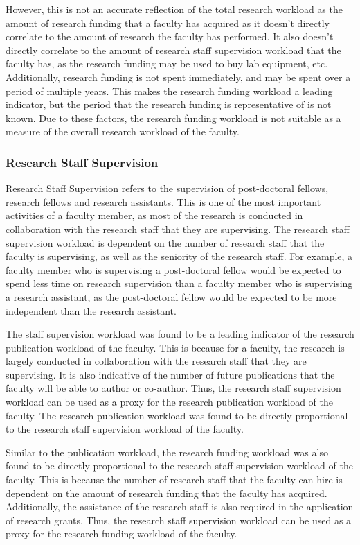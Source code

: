 However, this is not an accurate reflection of the total research workload as the amount of research funding that a faculty has acquired as it doesn't directly correlate to the amount of research the faculty has performed. It also doesn't directly correlate to the amount of research staff supervision workload that the faculty has, as the research funding may be used to buy lab equipment, etc. Additionally, research funding is not spent immediately, and may be spent over a period of multiple years. This makes the research funding workload a leading indicator, but the period that the research funding is representative of is not known. Due to these factors, the research funding workload is not suitable as a measure of the overall research workload of the faculty.

\subsubsection{Research Staff Supervision}

Research Staff Supervision refers to the supervision of post-doctoral fellows, research fellows and research assistants. This is one of the most important activities of a faculty member, as most of the research is conducted in collaboration with the research staff that they are supervising. The research staff supervision workload is dependent on the number of research staff that the faculty is supervising, as well as the seniority of the research staff. For example, a faculty member who is supervising a post-doctoral fellow would be expected to spend less time on research supervision than a faculty member who is supervising a research assistant, as the post-doctoral fellow would be expected to be more independent than the research assistant.

The staff supervision workload was found to be a leading indicator of the research publication workload of the faculty. This is because for a faculty, the research is largely conducted in collaboration with the research staff that they are supervising. It is also indicative of the number of future publications that the faculty will be able to author or co-author. Thus, the research staff supervision workload can be used as a proxy for the research publication workload of the faculty. The research publication workload was found to be directly proportional to the research staff supervision workload of the faculty.

Similar to the publication workload, the research funding workload was also found to be directly proportional to the research staff supervision workload of the faculty. This is because the number of research staff that the faculty can hire is dependent on the amount of research funding that the faculty has acquired. Additionally, the assistance of the research staff is also required in the application of research grants. Thus, the research staff supervision workload can be used as a proxy for the research funding workload of the faculty.

